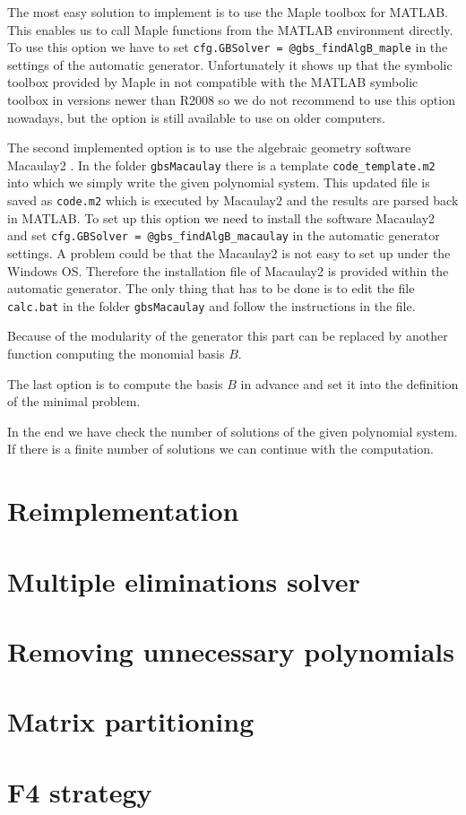 The most easy solution to implement is to use the Maple toolbox for MATLAB. This enables us to call Maple functions from the MATLAB environment directly. To use this option we have to set \texttt{cfg.GBSolver = @gbs\_findAlgB\_maple} in the settings of the automatic generator. Unfortunately it shows up that the symbolic toolbox provided by Maple in not compatible with the MATLAB symbolic toolbox in versions newer than R2008 so we do not recommend to use this option nowadays, but the option is still available to use on older computers.

The second implemented option is to use the algebraic geometry software Macaulay2 \cite{M2}. In the folder \texttt{gbsMacaulay} there is a template \texttt{code\_template.m2} into which we simply write the given polynomial system. This updated file is saved as \texttt{code.m2} which is executed by Macaulay2 and the results are parsed back in MATLAB. To set up this option we need to install the software Macaulay2 and set \texttt{cfg.GBSolver = @gbs\_findAlgB\_macaulay} in the automatic generator settings. A problem could be that the Macaulay2 is not easy to set up under the Windows OS. Therefore the installation file of Macaulay2 is provided within the automatic generator. The only thing that has to be done is to edit the file \texttt{calc.bat} in the folder \texttt{gbsMacaulay} and follow the instructions in the file.

Because of the modularity of the generator this part can be replaced by another function computing the monomial basis $B$.

The last option is to compute the basis $B$ in advance and set it into the definition of the minimal problem.

In the end we have check the number of solutions of the given polynomial system. If there is a finite number of solutions we can continue with the computation.

\section{Reimplementation}

\section{Multiple eliminations solver}

\section{Removing unnecessary polynomials}

\section{Matrix partitioning}

\section{F4 strategy}
